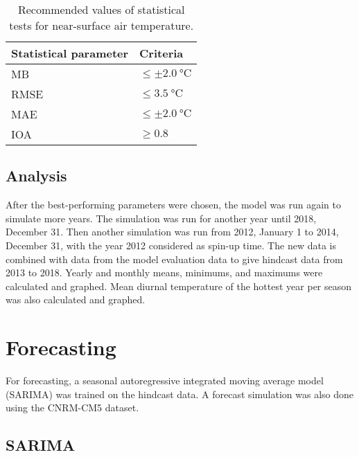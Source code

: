 		\begin{table}	
			\caption{Recommended values of statistical tests for near-surface air temperature.}
			\label{tab:performance-statistics-threshold}
			\centering
			\begin{tabular}{l l}
				\hline \hline
				Statistical parameter & Criteria\\
				\hline
				MB & $\leq \pm \qty{2.0}{\degreeCelsius}$ \\
				RMSE & $\leq \qty{3.5}{\degreeCelsius}$\\
				MAE & $\leq \pm \qty{2.0}{\degreeCelsius}$\\
				IOA	& $\geq \num{0.8}$\\
				\hline
			\end{tabular}		
		\end{table}

	\subsection{Analysis}
		After the best-performing parameters were chosen, the model was run again to simulate more years.
		The simulation was run for another year until 2018, December 31.
		Then another simulation was run from 2012, January 1 to 2014, December 31,
			with the year 2012 considered as spin-up time.
		The new data is combined with data from the model evaluation data to give hindcast data from 2013 to 2018.
		Yearly and monthly means, minimums, and maximums were calculated and graphed.
		Mean diurnal temperature of the hottest year per season was also calculated and graphed.
		

\section{Forecasting}
	For forecasting, a seasonal autoregressive integrated moving average model (SARIMA) was trained on the hindcast data.
	A forecast simulation was also done using the CNRM-CM5 dataset.
	
	\subsection{SARIMA}
	
